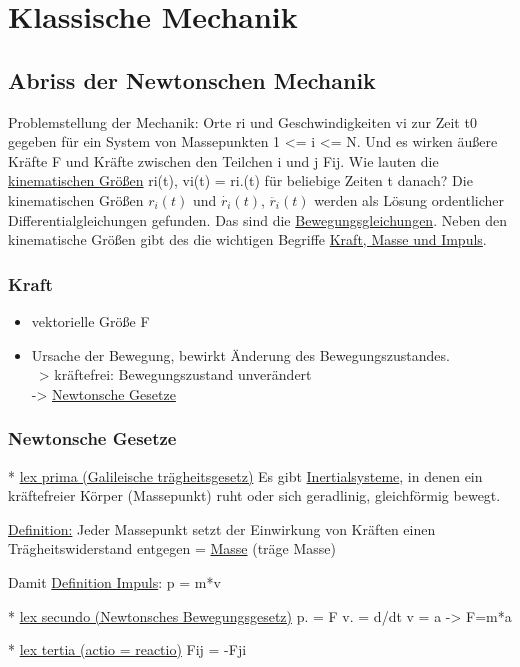 \chapter{Klassische Mechanik}
\section{Abriss der Newtonschen Mechanik}
Problemstellung der Mechanik:
Orte ri und Geschwindigkeiten vi zur Zeit t0 gegeben f\"ur ein System von Massepunkten 1 <= i <= N. Und es wirken \"außere Kr\"afte F und Kr\"afte zwischen den Teilchen i und j Fij.
Wie lauten die \underline{kinematischen Gr\"oßen} ri(t), vi(t) = ri.(t) f\"ur beliebige Zeiten t danach?
Die kinematischen Gr\"oßen $r_{i}(t)$ und $\dot{r_{i}}(t)$, $\ddot{r_{i}}(t)$ werden als L\"osung ordentlicher Differentialgleichungen gefunden. Das sind die \underline{Bewegungsgleichungen}.
Neben den kinematische Gr\"oßen gibt des die wichtigen Begriffe \underline{Kraft, Masse und Impuls}.

\subsection{Kraft}
\begin{itemize}
  \item vektorielle Gr\"oße F
  \item Ursache der Bewegung, bewirkt \"Anderung des Bewegungszustandes.\\
        ~> kr\"aftefrei: Bewegungszustand unver\"andert\\
        -> \underline{Newtonsche Gesetze}
\end{itemize}

\subsection{Newtonsche Gesetze}
* \underline{lex prima (Galileische tr\"agheitsgesetz)}
Es gibt \underline{Inertialsysteme}, in denen ein kr\"aftefreier K\"orper (Massepunkt) ruht oder sich geradlinig, gleichf\"ormig bewegt.

\underline{Definition:} Jeder Massepunkt setzt der Einwirkung von Kr\"aften einen Tr\"agheitswiderstand entgegen = \underline{Masse} (tr\"age Masse)

Damit \underline{Definition Impuls}:
p = m*v

* \underline{lex secundo (Newtonsches Bewegungsgesetz)}
p. = F
v. = d/dt v = a -> F=m*a

* \underline{lex tertia (actio = reactio)}
Fij = -Fji

